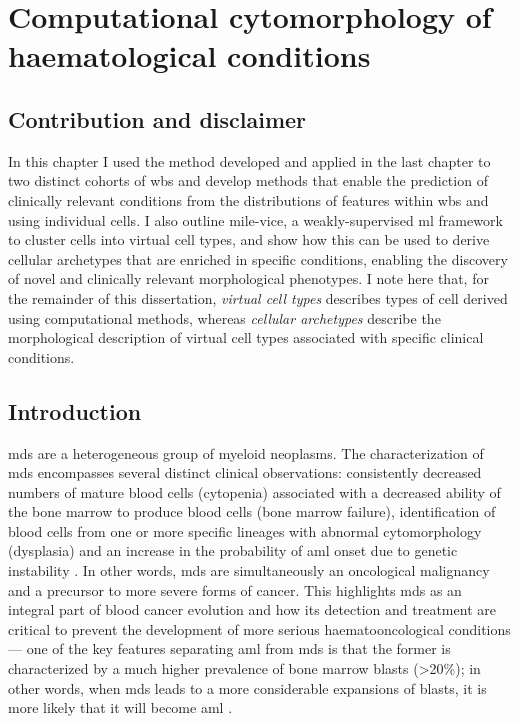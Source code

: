 \chapter{Computational cytomorphology of haematological conditions}

\section{Contribution and disclaimer}

In this chapter I used the method developed and applied in the last chapter to two distinct cohorts of \ac{wbs} and develop methods that enable the prediction of clinically relevant conditions from the distributions of features within \ac{wbs} and using individual cells. I also outline \ac{mile-vice}, a weakly-supervised \ac{ml} framework to cluster cells into virtual cell types, and show how this can be used to derive cellular archetypes that are enriched in specific conditions, enabling the discovery of novel and clinically relevant morphological phenotypes. I note here that, for the remainder of this dissertation, \textit{virtual cell types} describes types of cell derived using computational methods, whereas \textit{cellular archetypes} describe the morphological description of virtual cell types associated with specific clinical conditions.

\section{Introduction}

\ac{mds} are a heterogeneous group of myeloid neoplasms. The characterization of \ac{mds} encompasses several distinct clinical observations: consistently decreased numbers of mature blood cells (cytopenia) associated with a decreased ability of the bone marrow to produce blood cells (bone marrow failure), identification of blood cells from one or more specific lineages with abnormal cytomorphology (dysplasia) and an increase in the probability of \ac{aml} onset due to genetic instability \cite{Valent2017-uh,Hofmann2005-vv,Aster2020-cu}. In other words, \ac{mds} are simultaneously an oncological malignancy and a precursor to more severe forms of cancer. This highlights \ac{mds} as an integral part of blood cancer evolution and how its detection and treatment are critical to prevent the development of more serious haematooncological conditions --- one of the key features separating \ac{aml} from \ac{mds} is that the former is characterized by a much higher prevalence of bone marrow blasts (>20\%); in other words, when \ac{mds} leads to a more considerable expansions of blasts, it is more likely that it will become \ac{aml} \cite{Klepin2016-xg}.

